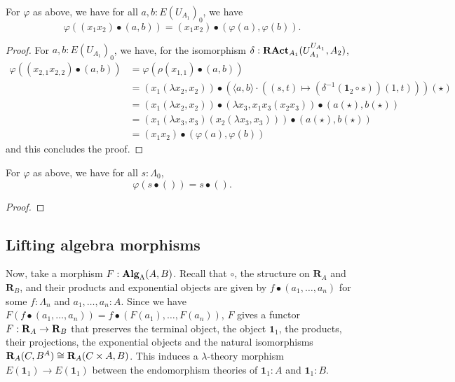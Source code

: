 \begin{lemma}
  For $ \varphi $ as above, we have for all $ a, b: E(U_{A_1})_0 $, we have
  \[ \varphi((x_1 x_2) \bullet (a, b)) = (x_1 x_2) \bullet (\varphi(a), \varphi(b)). \]
\end{lemma}
\begin{proof}
  For $ a, b: E(U_{A_1})_0 $, we have, for the isomorphism $ \delta: \mathbf{RAct}_{A_1}(U_{A_1}^{U_{A_1}}, A_2) $,
  \begin{align*}
    \varphi((x_{2, 1} x_{2, 2}) \bullet (a, b)) &= \varphi(\rho(x_{1, 1}) \bullet (a, b))\\
    &= (x_1 (\lambda x_2, x_2)) \bullet (\langle a, b \rangle \cdot ((s, t) \mapsto (\delta^{-1}(\mathbf 1_2 \circ s)) (1, t)))(\star)\\
    &= (x_1 (\lambda x_2, x_2)) \bullet (\lambda x_3, x_1 x_3 (x_2 x_3)) \bullet (a(\star), b(\star))\\
    &= (x_1 (\lambda x_3, x_3) (x_2 (\lambda x_3, x_3))) \bullet (a(\star), b(\star))\\
    &= (x_1 x_2) \bullet (\varphi(a), \varphi(b))
  \end{align*}
  and this concludes the proof.
\end{proof}

\begin{lemma}
  For $ \varphi $ as above, we have for all $ s: \Lambda_0 $,
  \[ \varphi(s \bullet ()) = s \bullet (). \]
\end{lemma}
\begin{proof}
  \TODO
\end{proof}


\subsection{Lifting algebra morphisms}

Now, take a morphism $ F: \mathbf{Alg}_{\Lambda}(A, B) $. Recall that $ \circ $, the structure on $ \mathbf R_A $ and $ \mathbf R_B $, and their products and exponential objects are given by $ f \bullet (a_1, \dots, a_n) $ for some $ f: \Lambda_n $ and $ a_1, \dots, a_n : A $. Since we have $ F(f \bullet (a_1, \dots, a_n)) = f \bullet (F(a_1), \dots, F(a_n)) $, $ F $ gives a functor $ F: \mathbf{R}_A \to \mathbf{R}_B $ that preserves the terminal object, the object $ \mathbf 1_1 $, the products, their projections, the exponential objects and the natural isomorphisms $ \mathbf{R}_A(C, B^A) \cong \mathbf{R}_A(C \times A, B) $. This induces a $ \lambda $-theory morphism $ E(\mathbf 1_1) \to E(\mathbf 1_1) $ between the endomorphism theories of $ \mathbf 1_1 : A $ and $ \mathbf 1_1 : B $.


